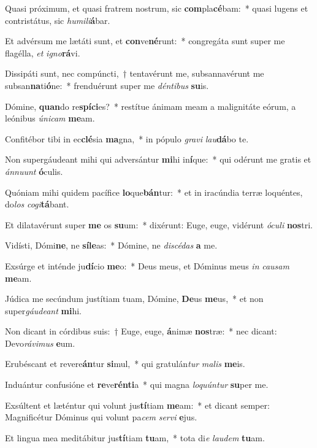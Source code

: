 \item Quasi próximum, et quasi fratrem nostrum, sic \textbf{com}pla\textbf{cé}bam:~* quasi lugens et contristátus, sic \textit{hu}\textit{mi}\textit{li}\textbf{á}bar.
\item Et advérsum me lætáti sunt, et \textbf{con}ve\textbf{né}runt:~* congregáta sunt super me flagélla, \textit{et} \textit{i}\textit{gno}\textbf{rá}vi.
\item Dissipáti sunt, nec compúncti,~† tentavérunt me, subsannavérunt me subsan\textbf{na}ti\textbf{ó}ne:~* frenduérunt super me \textit{dén}\textit{ti}\textit{bus} \textbf{su}is.
\item Dómine, \textbf{quan}do re\textbf{spí}\textbf{ci}es?~* restítue ánimam meam a malignitáte eórum, a leónibus \textit{ú}\textit{ni}\textit{cam} \textbf{me}am.
\item Confitébor tibi in ec\textbf{clé}sia \textbf{ma}gna,~* in pópulo \textit{gra}\textit{vi} \textit{lau}\textbf{dá}bo te.
\item Non supergáudeant mihi qui adversántur \textbf{mi}hi in\textbf{í}que:~* qui odérunt me gratis et \textit{án}\textit{nu}\textit{unt} \textbf{ó}culis.
\item Quóniam mihi quidem pacífice \textbf{lo}que\textbf{bán}tur:~* et in iracúndia terræ loquéntes, do\textit{los} \textit{co}\textit{gi}\textbf{tá}bant.
\item Et dilatavérunt super \textbf{me} os \textbf{su}um:~* dixérunt: Euge, euge, vidérunt \textit{ó}\textit{cu}\textit{li} \textbf{nos}tri.
\item Vidísti, Dómi\textbf{ne}, ne \textbf{sí}\textbf{le}as:~* Dómine, ne \textit{di}\textit{scé}\textit{das} \textbf{a} me.
\item Exsúrge et inténde ju\textbf{dí}cio \textbf{me}o:~* Deus meus, et Dóminus meus \textit{in} \textit{cau}\textit{sam} \textbf{me}am.
\item Júdica me secúndum justítiam tuam, Dómine, \textbf{De}us \textbf{me}us,~* et non super\textit{gáu}\textit{de}\textit{ant} \textbf{mi}hi.
\item Non dicant in córdibus suis:~† Euge, euge, \textbf{á}nimæ \textbf{nos}træ:~* nec dicant: Devo\textit{rá}\textit{vi}\textit{mus} \textbf{e}um.
\item Erubéscant et revere\textbf{án}tur \textbf{si}mul,~* qui gratulán\textit{tur} \textit{ma}\textit{lis} \textbf{me}is.
\item Induántur confusióne et \textbf{re}ve\textbf{rén}\textbf{ti}a~* qui magna \textit{lo}\textit{quún}\textit{tur} \textbf{su}per me.
\item Exsúltent et læténtur qui volunt jus\textbf{tí}tiam \textbf{me}am:~* et dicant semper: Magnificétur Dóminus qui volunt pa\textit{cem} \textit{ser}\textit{vi} \textbf{e}jus.
\item Et lingua mea meditábitur jus\textbf{tí}tiam \textbf{tu}am,~* tota di\textit{e} \textit{lau}\textit{dem} \textbf{tu}am.
